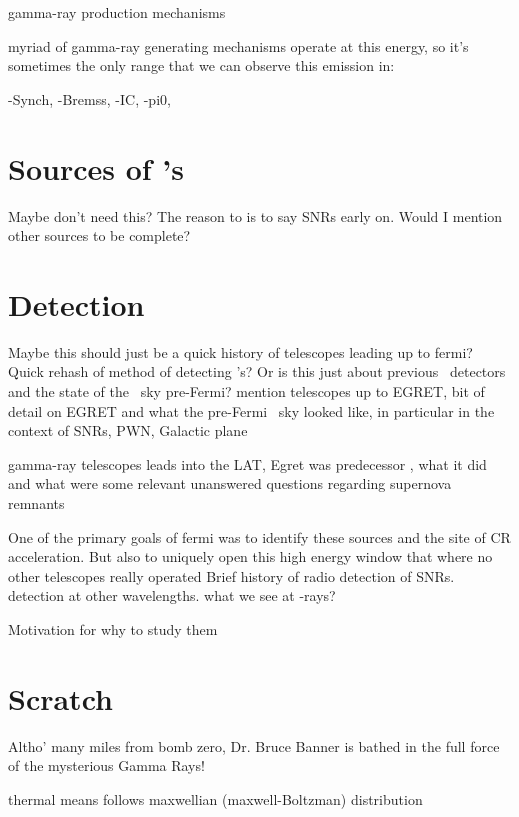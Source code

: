 gamma-ray production mechanisms

myriad of gamma-ray generating mechanisms operate at this energy, so it's sometimes the only range that we can observe this emission in:

-Synch,
-Bremss,
-IC,
-pi0,

\section{Sources of \gam's}\label{gamAstr:Sources}
Maybe don't need this? The reason to is to say SNRs early on. Would I mention other sources to be complete?

\section{\gam{} Detection}\label{gamAstr:Detect}
Maybe this should just be a quick history of \gam{} telescopes leading up to fermi?
Quick rehash of method of detecting \gam's? Or is this just about previous \gam ~detectors and the state of the \gam~sky pre-Fermi?  mention telescopes up to EGRET, bit of detail on EGRET and what the pre-Fermi \gam~sky looked like, in particular in the context of SNRs, PWN, Galactic plane

gamma-ray telescopes leads into the LAT, Egret was  predecessor , what it did and what were some relevant unanswered questions regarding supernova remnants 


One of the primary goals of fermi was to identify these sources and the site of CR acceleration. But also to uniquely open this high energy window that where no other telescopes really operated
Brief history of radio detection of SNRs. detection at other wavelengths. what we see at \g-rays?

Motivation for why to study them
\citep{Sturner95}
\citep{Esposito96}

\section{Scratch}

Altho' many miles from bomb zero, Dr. Bruce Banner is bathed in the full force of the mysterious Gamma Rays!

thermal means follows maxwellian (maxwell-Boltzman) distribution